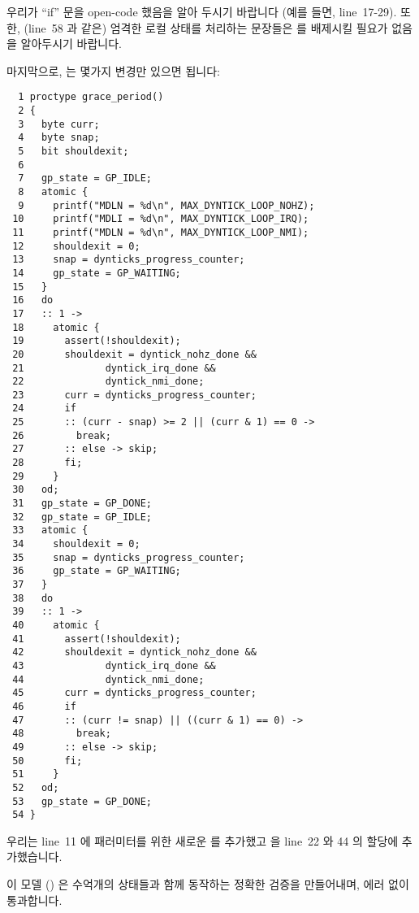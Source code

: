 우리가 ``if'' 문을 open-code 했음을 알아 두시기 바랍니다 (예를 들면,
line~17-29).
또한, (line~58 과 같은) 엄격한 로컬 상태를 처리하는 문장들은 
를 배제시킬 필요가 없음을 알아두시기 바랍니다.

마지막으로,  는 몇가지 변경만 있으면 됩니다:
\iffalse

Note that we have open-coded the ``if'' statements
(for example, lines~17-29).
In addition, statements that process strictly local state
(such as line~58) need not exclude \co{dyntick_nmi()}.

Finally, \co{grace_period()} requires only a few changes:
\fi

{ \scriptsize
\begin{verbatim}
  1 proctype grace_period()
  2 {
  3   byte curr;
  4   byte snap;
  5   bit shouldexit;
  6
  7   gp_state = GP_IDLE;
  8   atomic {
  9     printf("MDLN = %d\n", MAX_DYNTICK_LOOP_NOHZ);
 10     printf("MDLI = %d\n", MAX_DYNTICK_LOOP_IRQ);
 11     printf("MDLN = %d\n", MAX_DYNTICK_LOOP_NMI);
 12     shouldexit = 0;
 13     snap = dynticks_progress_counter;
 14     gp_state = GP_WAITING;
 15   }
 16   do
 17   :: 1 ->
 18     atomic {
 19       assert(!shouldexit);
 20       shouldexit = dyntick_nohz_done &&
 21              dyntick_irq_done &&
 22              dyntick_nmi_done;
 23       curr = dynticks_progress_counter;
 24       if
 25       :: (curr - snap) >= 2 || (curr & 1) == 0 ->
 26         break;
 27       :: else -> skip;
 28       fi;
 29     }
 30   od;
 31   gp_state = GP_DONE;
 32   gp_state = GP_IDLE;
 33   atomic {
 34     shouldexit = 0;
 35     snap = dynticks_progress_counter;
 36     gp_state = GP_WAITING;
 37   }
 38   do
 39   :: 1 ->
 40     atomic {
 41       assert(!shouldexit);
 42       shouldexit = dyntick_nohz_done &&
 43              dyntick_irq_done &&
 44              dyntick_nmi_done;
 45       curr = dynticks_progress_counter;
 46       if
 47       :: (curr != snap) || ((curr & 1) == 0) ->
 48         break;
 49       :: else -> skip;
 50       fi;
 51     }
 52   od;
 53   gp_state = GP_DONE;
 54 }
\end{verbatim}
}

우리는 line~11 에  패러미터를 위한 새로운
 를 추가했고  을 line~22 와 44 의
 할당에 추가했습니다.

이 모델 ()
은 수억개의 상태들과 함께 동작하는 정확한 검증을 만들어내며, 에러 없이
통과합니다.
\iffalse

